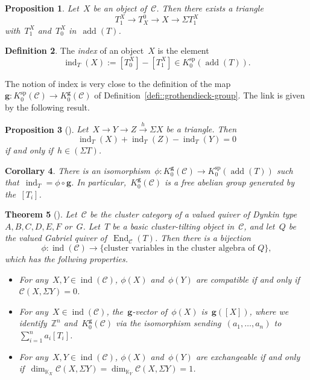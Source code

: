 \documentclass{amsart}
\newtheorem{theorem}{Theorem}[section]
\newtheorem{corollary}[theorem]{Corollary}
\newtheorem{proposition}[theorem]{Proposition}
\theoremstyle{definition}
\newtheorem{definition}[theorem]{Definition}
\newcommand{\Z}{\mathbb{Z}} %
\renewcommand{\b}[1]{{\boldsymbol{#1}}} %
\newcommand{\darkblue}{\color{darkblue}} %
\newcommand{\defn}[1]{\textsl{\darkblue #1}} %
\newcommand{\pg}[1]{\todo[color=green!30]{#1 \\ \hfill --- PG.}}
\newcommand{\field}{\mathbb{K}}
\newcommand{\cat}{\mathcal{C}}
\newcommand{\susp}{\Sigma}
\newcommand{\add}{\operatorname{add}}
\newcommand{\End}[1]{\operatorname{End}_{#1}}
\newcommand{\spl}{\operatorname{sp}}
\newcommand{\Ksp}{K_0^{\spl}}
\newcommand{\Kg}{K_0^{\b{g}}}
\newcommand{\ind}{\operatorname{ind}}
\newcommand{\CC}{\phi}
\begin{document}
\begin{proposition}
 Let~$X$ be an object of~$\cat$. Then there exists a triangle
 \[
  T_1^X \to T^0_X \to X \to \susp T_1^X
 \]
 with~$T_1^X$ and~$T_0^X$ in~$\add(T)$.

\end{proposition}

\begin{definition}
 The \defn{index} of an object~$X$ is the element
 \[
  \ind_T(X) := [T_0^X] - [T_1^X] \in \Ksp(\add(T)).
 \]
\end{definition}

The notion of index is very close to the definition of the map~$\b g:\Ksp(\cat)\to \Kg(\cat)$ of Definition~\ref{defi::grothendieck-group}.  The link is given by the following result.

\begin{proposition}[\cite{Palu}]
 Let~$X\xrightarrow{} Y \xrightarrow{} Z \xrightarrow{h} \susp X$ be a triangle.
 Then
 \[
  \ind_T(X) + \ind_T(Z) - \ind_T(Y) = 0
 \]
 if and only if~$h\in (\susp T)$.
\end{proposition}

\begin{corollary}
 There is an isomorphism~$\phi:\Kg(\cat) \to \Ksp(\add(T))$ such that~$\ind_T = \phi\circ \b g$.  In particular,~$\Kg(\cat)$ is a free abelian group generated by the~$[T_i]$.
\end{corollary}

\begin{theorem}[]\pg{cite???}
 Let~$\cat$ be the cluster category of a valued quiver of Dynkin type~$A,B,C,D,E,F$ or~$G$.  Let~$T$ be a basic cluster-tilting object in~$\cat$, and let~$Q$ be the valued Gabriel quiver of~$\End{\cat}(T)$.  Then there is a bijection
 \[
  \CC: \ind(\cat) \xrightarrow{} \{\textrm{cluster variables in the cluster algebra of~$Q$}\},
 \]
 which has the follwing properties.
 \begin{itemize}
  \item For any~$X,Y\in \ind(\cat)$, $\CC(X)$ and~$\CC(Y)$ are compatible if and only if~$\cat(X, \susp Y) = 0$.
  \item For any~$X\in \ind(\cat)$, the~$\b g$-vector of~$\CC(X)$ is~$\b g([X])$, where we identify~$\Z^n$ and~$\Kg(\cat)$ via the isomorphism sending~$(a_1, \ldots, a_n)$ to~$\sum_{i=1}^n a_i [T_i]$.
  \item For any~$X,Y\in \ind(\cat)$, $\CC(X)$ and~$\CC(Y)$ are exchangeable if and only if~$\dim_{\field_X}\cat(X, \susp Y) = \dim_{\field_Y}\cat(X, \susp Y) = 1$.
 \end{itemize}
\end{theorem}
\end{document}
